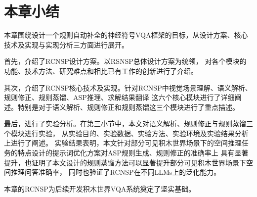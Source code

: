 \section{本章小结}
本章围绕设计一个规则自动补全的神经符号VQA框架的目标，从设计方案、核心技术及实现与实现分析三方面进行展开。

首先，介绍了RCNSP设计方案。以RSNSP总体设计方案为统领，
对各个模块的功能、技术方法、研究难点和相比已有工作的创新进行了介绍。

其次，介绍了RCNSP核心技术及实现。针对RCNSP中视觉场景理解、语义解析、规则修正、规则蒸馏、ASP推理、求解结果翻译
这六个核心模块进行了详细阐述。特别是对于语义解析、规则修正和规则蒸馏这三个模块进行了重点描述。

最后，进行了实验分析。在第三小节中，本文对语义解析、规则修正与规则蒸馏三个模块进行实验，
从实验目的、实验数据、实验方法、实验环境及实验结果分析上进行了阐述。
实验结果表明，本文针对部分可见积木世界场景下的空间推理任务的特点设计的提示词优化方案对ASP规则生成、规则修正的准确率上
具有显著提升，也证明了本文设计的规则蒸馏方法可以显著提升部分可见积木世界场景下空间推理问答准确率，
同时也验证了RCNSP在不同LLMs上的泛化能力。

本章的RCNSP为后续开发积木世界VQA系统奠定了坚实基础。